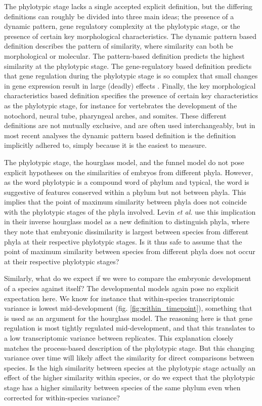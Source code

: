 The phylotypic stage lacks a single accepted explicit definition, but the differing definitions can roughly be divided into three main ideas; the presence of a dynamic pattern, gene regulatory complexity at the phylotypic stage, or the presence of certain key morphological characteristics\cite{OlafRP2003}. The dynamic pattern based definition describes the pattern of similarity, where similarity can both be morphological or molecular\cite{Slack1993,Duboule1994}. The pattern-based definition predicts the highest similarity at the phylotypic stage. The gene-regulatory based definition predicts that gene regulation during the phylotypic stage is so complex that small changes in gene expression result in large (deadly) effects \cite{raff1996}. Finally, the key morphological characteristics based definition specifies the presence of certain key characteristics as the phylotypic stage, for instance for vertebrates the development of the notochord, neural tube, pharyngeal arches, and somites\cite{Kimmel1995}. These different definitions are not mutually exclusive, and are often used interchangeably, but in most recent analyses the dynamic pattern based definition is the definition implicitly adhered to, simply because it is the easiest to measure.

The phylotypic stage, the hourglass model, and the funnel model do not pose explicit hypotheses on the similarities of embryos from different phyla. However, as the word phylotypic is a compound word of phylum and typical, the word is suggestive of features conserved within a phylum but not between phyla. This implies that the point of maximum similarity between phyla does not coincide with the phylotypic stages of the phyla involved. Levin \textit{et al.}\cite{Levin2016} use this implication in their inverse hourglass model as a new definition to distinguish phyla, where they note that embryonic dissimilarity is largest between species from different phyla at their respective phylotypic stages. Is it thus safe to assume that the point of maximum similarity between species from different phyla does not occur at their respective phylotypic stages? 

Similarly, what do we expect if we were to compare the embryonic development of a species against itself? The developmental models again pose no explicit expectation here. We know for instance that within-species transcriptomic variance is lowest mid-development (fig. \ref{fig:within_timepoint}), something that is used as an argument for the hourglass model\cite{Liu2020, Uchida2022}. The reasoning here is that gene regulation is most tightly regulated mid-development, and that this translates to a low transcriptomic variance between replicates. This explanation closely matches the process-based description of the phylotypic stage. But this changing variance over time will likely affect the similarity for direct comparisons between species. Is the high similarity between species at the phylotypic stage actually an effect of the higher similarity within species, or do we expect that the phylotypic stage has a higher similarity between species of the same phylum even when corrected for within-species variance?


